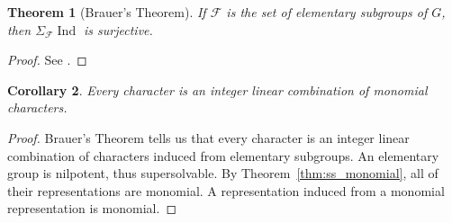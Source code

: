 \documentclass[12pt]{article}
\theoremstyle{plain}
\newtheorem{theorem}{Theorem}[section]
\newtheorem{corollary}[theorem]{Corollary}
\theoremstyle{definition}
\theoremstyle{remark}
\numberwithin{equation}{section}
\begin{document}
\begin{theorem}[Brauer's Theorem]
If $\mathcal{F}$ is the set of elementary subgroups of $G$,
then $\Sigma_{\mathcal{F}} \operatorname{Ind}$ is surjective.
\end{theorem}

\begin{proof}
See \cite[\S{10}]{Serre}.
\end{proof}

\begin{corollary}
Every character is an integer linear combination of monomial characters.
\end{corollary}

\begin{proof}
Brauer's Theorem tells us that every character is an integer linear
combination of characters induced from elementary subgroups.
An elementary group is nilpotent, thus supersolvable.
By Theorem~\ref{thm:ss_monomial}, all of their representations are
monomial.
A representation induced from a monomial representation is monomial.
\end{proof}



\end{document}
